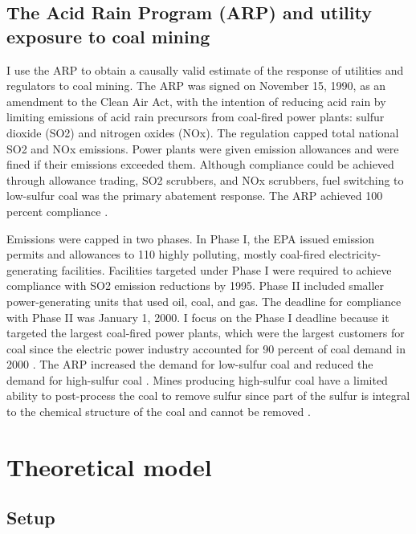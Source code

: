 \documentclass[12pt]{article}
\begin{document}
\subsection{The Acid Rain Program (ARP) and utility exposure to coal mining}

I use the ARP to obtain a causally valid estimate of the response of utilities and regulators to coal mining. The ARP was signed on November 15, 1990, as an amendment to the Clean Air Act, with the intention of reducing acid rain by limiting emissions of acid rain precursors from coal-fired power plants: sulfur dioxide (SO2) and nitrogen oxides (NOx). The regulation capped total national SO2 and NOx emissions. Power plants were given emission allowances and were fined if their emissions exceeded them. Although compliance could be achieved through allowance trading, SO2 scrubbers, and NOx scrubbers, fuel switching to low-sulfur coal was the primary abatement response. The ARP achieved 100 percent compliance \parencite{lattanzio2022clean}. 

Emissions were capped in two phases. In Phase I, the EPA issued emission permits and allowances to 110 highly polluting, mostly coal-fired electricity-generating facilities. Facilities targeted under Phase I were required to achieve compliance with SO2 emission reductions by 1995. Phase II included smaller power-generating units that used oil, coal, and gas. The deadline for compliance with Phase II was January 1, 2000. I focus on the Phase I deadline because it targeted the largest coal-fired power plants, which were the largest customers for coal since the electric power industry accounted for 90 percent of coal demand in 2000 \parencite{freme2000us}. The ARP increased the demand for low-sulfur coal and reduced the demand for high-sulfur coal \parencite{epaarpcoalemp, stratford2015coalprod}. Mines producing high-sulfur coal have a limited ability to post-process the coal to remove sulfur since part of the sulfur is integral to the chemical structure of the coal and cannot be removed \parencite{wheelock1984coal}.

\section{Theoretical model}\label{sec:model}
	
	\subsection{Setup}
	
\end{document}
